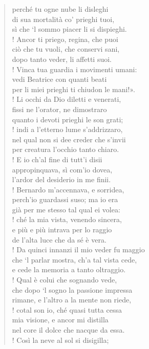 \documentclass[a4paper, twoside, titlepage]{book}
\begin{document}
\begin{verse}
perché tu ogne nube li disleghi\\
di sua mortalità co’ prieghi tuoi,\\
sì che ‘l sommo piacer li si dispieghi.\\!
Ancor ti priego, regina, che puoi\\
ciò che tu vuoli, che conservi sani,\\
dopo tanto veder, li affetti suoi.\\!
Vinca tua guardia i movimenti umani:\\
vedi Beatrice con quanti beati\\
per li miei prieghi ti chiudon le mani!».\\!
Li occhi da Dio diletti e venerati,\\
fissi ne l’orator, ne dimostraro\\
quanto i devoti prieghi le son grati;\\!
indi a l’etterno lume s’addrizzaro,\\
nel qual non si dee creder che s’invii\\
per creatura l’occhio tanto chiaro.\\!
E io ch’al fine di tutt’i disii\\
appropinquava, sì com’io dovea,\\
l’ardor del desiderio in me finii.\\!
Bernardo m’accennava, e sorridea,\\
perch’io guardassi suso; ma io era\\
già per me stesso tal qual ei volea:\\!
ché la mia vista, venendo sincera,\\
e più e più intrava per lo raggio\\
de l’alta luce che da sé è vera.\\!
Da quinci innanzi il mio veder fu maggio\\
che ‘l parlar mostra, ch’a tal vista cede,\\
e cede la memoria a tanto oltraggio.\\!
Qual è colui che sognando vede,\\
che dopo ‘l sogno la passione impressa\\
rimane, e l’altro a la mente non riede,\\!
cotal son io, ché quasi tutta cessa\\
mia visione, e ancor mi distilla\\
nel core il dolce che nacque da essa.\\!
Così la neve al sol si disigilla;\\

\end{verse}
\end{document}
